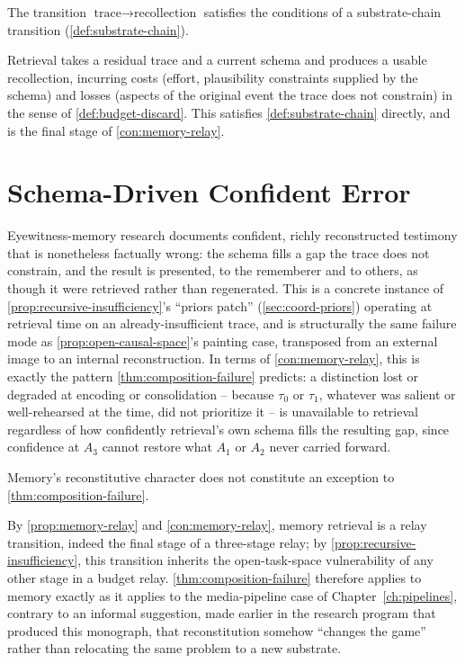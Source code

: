 \begin{proposition}
\label{prop:memory-relay}
The transition $\text{trace} \to \text{recollection}$ satisfies the
conditions of a substrate-chain transition (\cref{def:substrate-chain}).
\end{proposition}

\begin{proofsketch}
Retrieval takes a residual trace and a current schema and produces a
usable recollection, incurring costs (effort, plausibility constraints
supplied by the schema) and losses (aspects of the original event the
trace does not constrain) in the sense of \cref{def:budget-discard}. This
satisfies \cref{def:substrate-chain} directly, and is the final stage of
\cref{con:memory-relay}.
\end{proofsketch}

\section{Schema-Driven Confident Error}

Eyewitness-memory research documents confident, richly reconstructed
testimony that is nonetheless factually wrong: the schema fills a gap the
trace does not constrain, and the result is presented, to the rememberer
and to others, as though it were retrieved rather than regenerated. This
is a concrete instance of \cref{prop:recursive-insufficiency}'s ``priors
patch'' (\cref{sec:coord-priors}) operating at retrieval time on an
already-insufficient trace, and is structurally the same failure mode as
\cref{prop:open-causal-space}'s painting case, transposed from an
external image to an internal reconstruction. In terms of
\cref{con:memory-relay}, this is exactly the pattern
\cref{thm:composition-failure} predicts: a distinction lost or degraded
at encoding or consolidation -- because $\tau_0$ or $\tau_1$, whatever
was salient or well-rehearsed at the time, did not prioritize it -- is
unavailable to retrieval regardless of how confidently retrieval's own
schema fills the resulting gap, since confidence at $A_3$ cannot restore
what $A_1$ or $A_2$ never carried forward.

\begin{proposition}
\label{prop:memory-no-escape}
Memory's reconstitutive character does not constitute an exception to
\cref{thm:composition-failure}.
\end{proposition}

\begin{proofsketch}
By \cref{prop:memory-relay} and \cref{con:memory-relay}, memory retrieval
is a relay transition, indeed the final stage of a three-stage relay; by
\cref{prop:recursive-insufficiency}, this transition inherits the
open-task-space vulnerability of any other stage in a budget relay.
\cref{thm:composition-failure} therefore applies to memory exactly as it
applies to the media-pipeline case of Chapter~\ref{ch:pipelines},
contrary to an informal suggestion, made earlier in the research program
that produced this monograph, that reconstitution somehow ``changes the
game'' rather than relocating the same problem to a new substrate.
\end{proofsketch}
